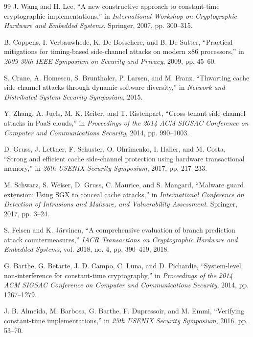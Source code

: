 \documentclass[11pt,a4paper]{article}
\theoremstyle{definition}
\begin{document}
\begin{thebibliography}{99}
J. Wang and H. Lee, ``A new constructive approach to constant-time cryptographic implementations,'' in \textit{International Workshop on Cryptographic Hardware and Embedded Systems}. Springer, 2007, pp. 300--315.

B. Coppens, I. Verbauwhede, K. De Bosschere, and B. De Sutter, ``Practical mitigations for timing-based side-channel attacks on modern x86 processors,'' in \textit{2009 30th IEEE Symposium on Security and Privacy}, 2009, pp. 45--60.

S. Crane, A. Homescu, S. Brunthaler, P. Larsen, and M. Franz, ``Thwarting cache side-channel attacks through dynamic software diversity,'' in \textit{Network and Distributed System Security Symposium}, 2015.

Y. Zhang, A. Juels, M. K. Reiter, and T. Ristenpart, ``Cross-tenant side-channel attacks in PaaS clouds,'' in \textit{Proceedings of the 2014 ACM SIGSAC Conference on Computer and Communications Security}, 2014, pp. 990--1003.

D. Gruss, J. Lettner, F. Schuster, O. Ohrimenko, I. Haller, and M. Costa, ``Strong and efficient cache side-channel protection using hardware transactional memory,'' in \textit{26th USENIX Security Symposium}, 2017, pp. 217--233.

M. Schwarz, S. Weiser, D. Gruss, C. Maurice, and S. Mangard, ``Malware guard extension: Using SGX to conceal cache attacks,'' in \textit{International Conference on Detection of Intrusions and Malware, and Vulnerability Assessment}. Springer, 2017, pp. 3--24.

S. Felsen and K. Järvinen, ``A comprehensive evaluation of branch prediction attack countermeasures,'' \textit{IACR Transactions on Cryptographic Hardware and Embedded Systems}, vol. 2018, no. 4, pp. 390--419, 2018.

G. Barthe, G. Betarte, J. D. Campo, C. Luna, and D. Pichardie, ``System-level non-interference for constant-time cryptography,'' in \textit{Proceedings of the 2014 ACM SIGSAC Conference on Computer and Communications Security}, 2014, pp. 1267--1279.

J. B. Almeida, M. Barbosa, G. Barthe, F. Dupressoir, and M. Emmi, ``Verifying constant-time implementations,'' in \textit{25th USENIX Security Symposium}, 2016, pp. 53--70.


\end{thebibliography}
\end{document}
